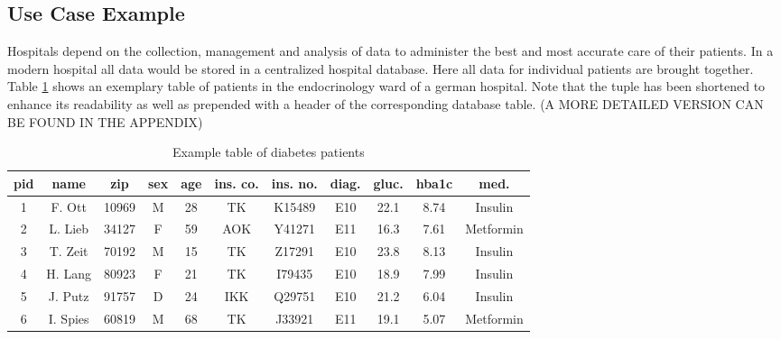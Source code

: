 \subsection{Use Case Example}
Hospitals depend on the collection, management and analysis of data to administer the best and most accurate care of their patients. In a modern hospital all data would be stored in a centralized hospital database. 
Here all data for individual patients are brought together. Table \ref{table:dia_patient} shows an exemplary table of patients in the endocrinology ward of a german hospital. Note that the tuple has been shortened to enhance its readability as well as prepended with a header of the corresponding database table.  (A MORE DETAILED VERSION CAN BE FOUND IN THE APPENDIX)


\bigskip 


\begin{table}[ht]
    \begin{center}
    \footnotesize{
        \renewcommand{\arraystretch}{1.5}
        \begin{tabular}{ | c | c | c | c | c | c | c | c | c | c | c | } 
            \hline
            pid & name & zip & sex & age & ins. co. & ins. no. & diag. & gluc. & hba1c & med. \\
            \hline
            1 & F. Ott & 10969 & M & 28 & TK & K15489 & E10 & 22.1 & 8.74 & Insulin \\
            \hline
            2 & L. Lieb & 34127 & F & 59 & AOK & Y41271 & E11 & 16.3 & 7.61 & Metformin \\
            \hline 
            3 & T. Zeit & 70192 & M & 15 & TK & Z17291 & E10 & 23.8 & 8.13 & Insulin \\
            \hline
            4 & H. Lang & 80923 & F & 21 & TK & I79435 & E10 & 18.9 & 7.99 & Insulin \\
            \hline
            5 & J. Putz & 91757 & D & 24 & IKK & Q29751 & E10 & 21.2 & 6.04 & Insulin \\
            \hline
            6 & I. Spies & 60819 & M & 68 & TK & J33921 & E11 & 19.1 & 5.07 & Metformin \\
            \hline
        \end{tabular}
    }
    \caption{Example table of diabetes patients}
    \label{table:dia_patient}
    \end{center}
\end{table}

